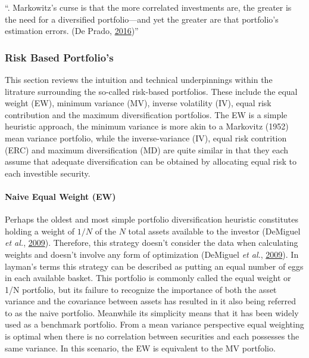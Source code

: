 \documentclass[11pt,preprint, authoryear]{elsarticle}
\numberwithin{equation}{section}
\numberwithin{figure}{section}
\numberwithin{table}{section}
\begin{document}
``. Markowitz's curse is that the more correlated investments are, the
greater is the need for a diversified portfolio---and yet the greater
are that portfolio's estimation errors. (De Prado,
\protect\hyperlink{ref-lopez}{2016})''

\hypertarget{risk-based-portfolios}{%
\subsubsection{Risk Based Portfolio's}\label{risk-based-portfolios}}

This section reviews the intuition and technical underpinnings within
the litrature surrounding the so-called risk-based portfolios. These
include the equal weight (EW), minimum variance (MV), inverse volatility
(IV), equal risk contribution and the maximum diversification
portfolios. The EW is a simple heuristic approach, the minimum variance
is more akin to a Markovitz (1952) mean variance portfolio, while the
inverse-variance (IV), equal risk contrition (ERC) and maximum
diversification (MD) are quite similar in that they each assume that
adequate diversification can be obtained by allocating equal risk to
each investible security.

\hypertarget{naive-equal-weight-ew}{%
\paragraph{Naive Equal Weight (EW)}\label{naive-equal-weight-ew}}

Perhaps the oldest and most simple portfolio diversification heuristic
constitutes holding a weight of \(1/N\) of the \(N\) total assets
available to the investor (DeMiguel \emph{et al.},
\protect\hyperlink{ref-demiguel2009}{2009}). Therefore, this strategy
doesn't consider the data when calculating weights and doesn't involve
any form of optimization (DeMiguel \emph{et al.},
\protect\hyperlink{ref-demiguel2009}{2009}). In layman's terms this
strategy can be described as putting an equal number of eggs in each
available basket. This portfolio is commonly called the equal weight or
1/N portfolio, but its failure to recognize the importance of both the
asset variance and the covariance between assets has resulted in it also
being referred to as the naive portfolio. Meanwhile its simplicity means
that it has been widely used as a benchmark portfolio. From a mean
variance perspective equal weighting is optimal when there is no
correlation between securities and each possesses the same variance. In
this scenario, the EW is equivalent to the MV portfolio.
\end{document}
